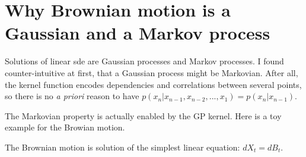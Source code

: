 




\chapter{Why Brownian motion is a Gaussian and a Markov process}\label{brownian_motion_gaussian_and_markov}

Solutions of linear \gls{sde} are Gaussian processes and Markov processes. I found counter-intuitive at first, that a Gaussian process might be Markovian.
After all, the kernel function encodes dependencies and correlations between several points, so there is no \textit{a priori} reason to have 
$p(x_n \vert x_{n-1}, x_{n-2}, ... , x_1) = p(x_n \vert x_{n-1})$.

The Markovian property is actually enabled by the GP kernel. Here is a toy example for the Browian motion.

The Brownian motion is solution of the simplest linear equation: $dX_t = dB_t$.


